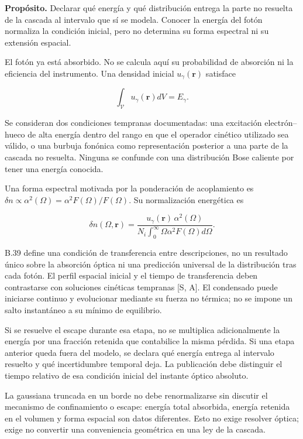 \documentclass[
  spanish,
  10pt,
  a4paper,
]{article}
\begin{document}
\textbf{Propósito.} Declarar qué energía y qué distribución entrega la
parte no resuelta de la cascada al intervalo que sí se modela. Conocer
la energía del fotón normaliza la condición inicial, pero no determina
su forma espectral ni su extensión espacial.

El fotón ya está absorbido. No se calcula aquí su probabilidad de
absorción ni la eficiencia del instrumento. Una densidad inicial
\(u_\gamma(\mathbf r)\) satisface

\[
\int_{\mathcal V}u_\gamma(\mathbf r)dV=E_\gamma. \tag{B.38}
\]

Se consideran dos condiciones tempranas documentadas: una excitación
electrón--hueco de alta energía dentro del rango en que el operador
cinético utilizado sea válido, o una burbuja fonónica como
representación posterior a una parte de la cascada no resuelta. Ninguna
se confunde con una distribución Bose caliente por tener una energía
conocida.

Una forma espectral motivada por la ponderación de acoplamiento es
\(\delta n\propto\alpha^2(\Omega)=\alpha^2F(\Omega)/F(\Omega)\). Su
normalización energética es

\[
\delta n(\Omega,\mathbf r)=
\frac{u_\gamma(\mathbf r)\,\alpha^2(\Omega)}
{N_i\int_0^\infty\Omega\alpha^2F(\Omega)d\Omega}.
\tag{B.39}
\]

B.39 define una condición de transferencia entre descripciones, no un
resultado único sobre la absorción óptica ni una predicción universal de
la distribución tras cada fotón. El perfil espacial inicial y el tiempo
de transferencia deben contrastarse con soluciones cinéticas tempranas
{[}S, A{]}. El condensado puede iniciarse continuo y evolucionar
mediante su fuerza no térmica; no se impone un salto instantáneo a su
mínimo de equilibrio.

Si se resuelve el escape durante esa etapa, no se multiplica
adicionalmente la energía por una fracción retenida que contabilice la
misma pérdida. Si una etapa anterior queda fuera del modelo, se declara
qué energía entrega al intervalo resuelto y qué incertidumbre temporal
deja. La publicación debe distinguir el tiempo relativo de esa condición
inicial del instante óptico absoluto.

La gaussiana truncada en un borde no debe renormalizarse sin discutir el
mecanismo de confinamiento o escape: energía total absorbida, energía
retenida en el volumen y forma espacial son datos diferentes. Esto no
exige resolver óptica; exige no convertir una conveniencia geométrica en
una ley de la cascada.
\end{document}
